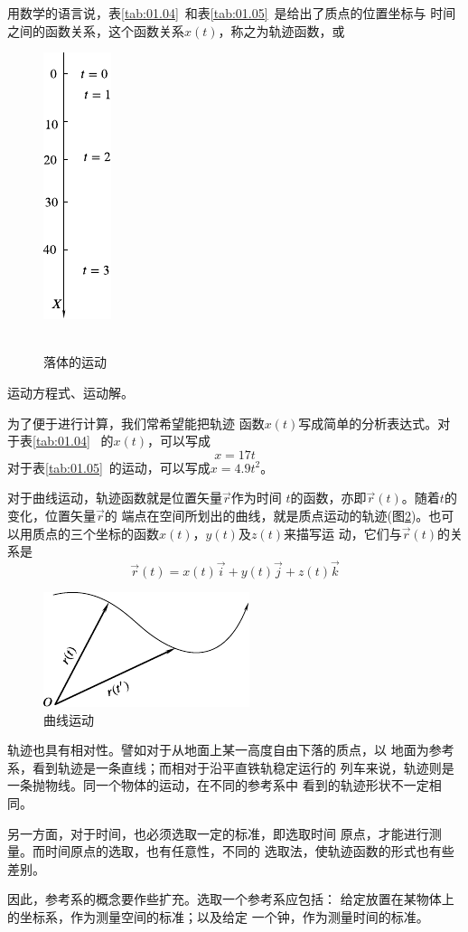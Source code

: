 用数学的语言说，表\ref{tab:01.04}~和表\ref{tab:01.05}~是给出了质点的位置坐标与
时间之间的函数关系，这个函数关系$x\left(t\right)$，称之为轨迹函数，或
\begin{figure}
  \centering
  \includegraphics{figure/fig01.08}
  \\ ~ \\
  \caption{落体的运动}
  \label{fig:01.08}
\end{figure}
运动方程式、运动解。

为了便于进行计算，我们常希望能把轨迹
函数$x\left(t\right)$写成简单的分析表达式。对于表\ref{tab:01.04}~
的$x\left(t\right)$，可以写成
\begin{equation}\label{eqn:01.05.01}
  x=17t
\end{equation}
对于表\ref{tab:01.05}~的运动，可以写成$x=4.9t^2$。

对于曲线运动，轨迹函数就是位置矢量$\vec{r}$作为时间
$t$的函数，亦即$\vec{r}\left(t\right)$。随着$t$的变化，位置矢量$\vec{r}$的
端点在空间所划出的曲线，就是质点运动的轨迹(图\ref{fig:01.09})。也可
以用质点的三个坐标的函数$x\left(t\right)$，$y\left(t\right)$及$z\left(t\right)$来描写运
动，它们与$\vec{r}\left(t\right)$的关系是
\clearpage
\begin{equation}\label{eqn:01.05.02}
  \vec{r}\left(t\right)=x\left(t\right)\vec{i}+y\left(t\right)\vec{j}+z\left(t\right)\vec{k}
\end{equation}

\begin{figure}
  \centering
  \includegraphics{figure/fig01.09}
  \caption{曲线运动}
  \label{fig:01.09}
\end{figure}
轨迹也具有相对性。譬如对于从地面上某一高度自由下落的质点，以
地面为参考系，看到轨迹是一条直线；而相对于沿平直铁轨稳定运行的
列车来说，轨迹则是一条抛物线。同一个物体的运动，在不同的参考系中
看到的轨迹形状不一定相同。

另一方面，对于时间，也必须选取一定的标准，即选取时间
原点，才能进行测量。而时间原点的选取，也有任意性，不同的
选取法，使轨迹函数的形式也有些差别。

因此，参考系的概念要作些扩充。选取一个参考系应包括：
给定放置在某物体上的坐标系，作为测量空间的标准；以及给定
一个钟，作为测量时间的标准。
